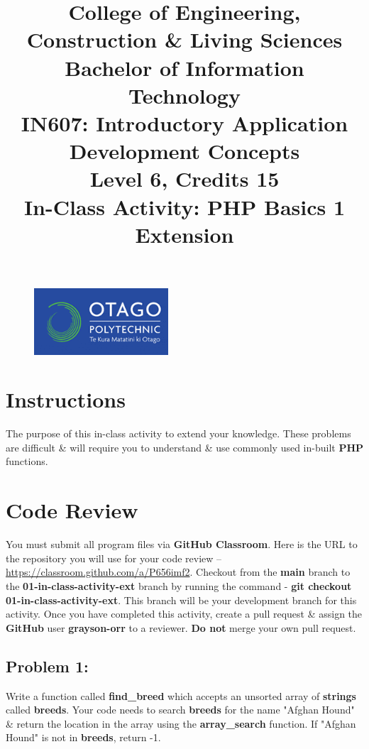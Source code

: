 \documentclass{article}
\author{}
\begin{document}
\begin{figure}
    \centering
    \includegraphics[width=50mm]{../img/logo.png}
\end{figure}

\title{College of Engineering, Construction \& Living Sciences\\Bachelor of Information Technology\\IN607: Introductory Application Development Concepts\\Level 6, Credits 15\\\textbf{In-Class Activity: PHP Basics 1 Extension}}
\date{}
\maketitle
 
\section*{Instructions}
The purpose of this in-class activity to extend your knowledge. These problems are difficult \& will require you to understand \& use commonly used in-built \textbf{PHP} functions.

\section*{Code Review}
You must submit all program files via \textbf{GitHub Classroom}. Here is the URL to the repository you will use for your code review – \href{https://classroom.github.com/a/P656imf2}{https://classroom.github.com/a/P656imf2}. Checkout from the \textbf{main} branch to the \textbf{01-in-class-activity-ext} branch by running the command - \textbf{git checkout 01-in-class-activity-ext}. This branch will be your development branch for this activity. Once you have completed this activity, create a pull request \& assign the \textbf{GitHub} user \textbf{grayson-orr} to a reviewer. \textbf{Do not} merge your own pull request.

\subsection*{Problem 1:} 
Write a function called \textbf{find\_breed} which accepts an unsorted array of \textbf{strings} called \textbf{breeds}. Your code needs to search \textbf{breeds} for the name "Afghan Hound" \& return the location in the array using the \textbf{array\_search} function. If "Afghan Hound" is not in \textbf{breeds}, return -1.
\end{document}
